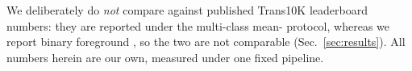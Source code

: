 We deliberately do \emph{not} compare against published Trans10K leaderboard
numbers: they are reported under the multi-class mean-\iou{} protocol, whereas we
report binary foreground \iou, so the two are not comparable
(Sec.~\ref{sec:results}). All numbers herein are our own, measured under one
fixed pipeline.

